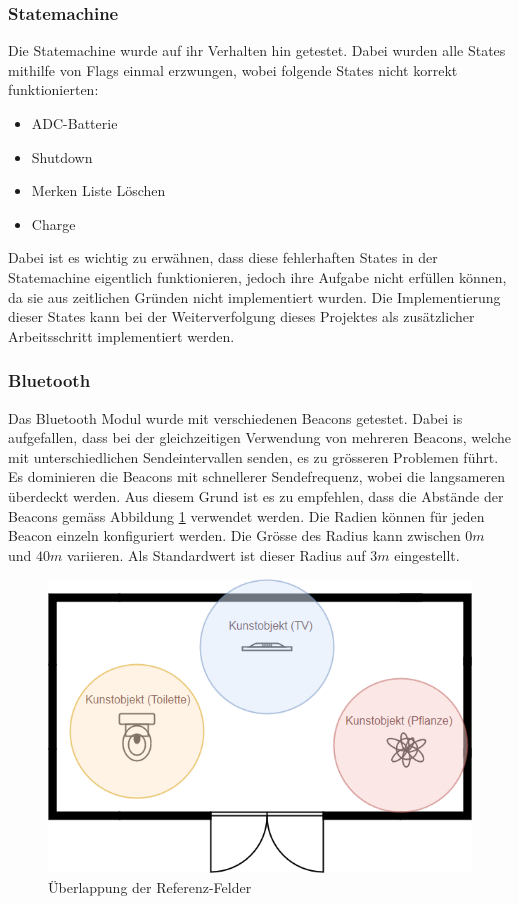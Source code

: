 \subsubsection{Statemachine}
Die Statemachine wurde auf ihr Verhalten hin getestet. Dabei wurden alle States mithilfe von Flags einmal erzwungen, wobei folgende States nicht korrekt funktionierten:

\begin{itemize}
	\item ADC-Batterie 
	\item Shutdown
	\item Merken Liste Löschen
	\item Charge
\end{itemize}

Dabei ist es wichtig zu erwähnen, dass diese {\glqq fehlerhaften States\grqq} in der Statemachine eigentlich funktionieren, jedoch ihre Aufgabe nicht erfüllen können, da sie aus zeitlichen Gründen nicht implementiert wurden. Die Implementierung dieser States kann bei der Weiterverfolgung dieses Projektes als zusätzlicher Arbeitsschritt implementiert werden.

\subsubsection{Bluetooth}
Das Bluetooth Modul wurde mit verschiedenen Beacons getestet. Dabei is aufgefallen, dass bei der gleichzeitigen Verwendung von mehreren Beacons, welche mit unterschiedlichen Sendeintervallen senden, es zu grösseren Problemen führt. Es dominieren die Beacons mit schnellerer Sendefrequenz, wobei die langsameren überdeckt werden. Aus diesem Grund ist es zu empfehlen, dass die Abstände der Beacons gemäss Abbildung \ref{fig:ref_felder} verwendet werden. Die Radien können für jeden Beacon einzeln konfiguriert werden. Die Grösse des Radius kann zwischen $0m$ und $40m$ variieren. Als Standardwert ist dieser Radius auf $3m$ eingestellt.

\begin{figure}[H]
	\begin{center}
		\includegraphics[width=120mm]{data/validierung_software_ref_felder.png}
		\caption[Überlappung der Referenz-Felder]{Überlappung der Referenz-Felder} %
		\label{fig:ref_felder}
	\end{center}
\end{figure}

